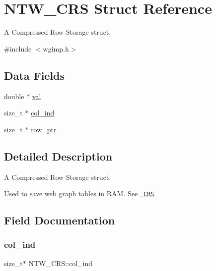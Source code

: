 \hypertarget{structNTW__CRS}{}\section{N\+T\+W\+\_\+\+C\+RS Struct Reference}
\label{structNTW__CRS}


A Compressed Row Storage struct.  




{\ttfamily \#include $<$wgimp.\+h$>$}

\subsection*{Data Fields}
\begin{DoxyCompactItemize}
\item 
double $\ast$ \mbox{\hyperlink{structNTW__CRS_abe01efe3d4a64ef6ed470021481a03ae}{val}}
\item 
size\+\_\+t $\ast$ \mbox{\hyperlink{structNTW__CRS_ac31b5a5fc330dd97ce536dd8a5f9182d}{col\+\_\+ind}}
\item 
size\+\_\+t $\ast$ \mbox{\hyperlink{structNTW__CRS_af5999845d1d6173e930a1c502042d239}{row\+\_\+ptr}}
\end{DoxyCompactItemize}


\subsection{Detailed Description}
A Compressed Row Storage struct. 

Used to save web graph tables in R\+AM. See \href{http://netlib.org/linalg/html_templates/node91.html#SECTION00931100000000000000}\texttt{ C\+RS} 

\subsection{Field Documentation}
\mbox{\label{structNTW__CRS_ac31b5a5fc330dd97ce536dd8a5f9182d}} 
\subsubsection{\texorpdfstring{col\+\_\+ind}{col\_ind}}
{\footnotesize\ttfamily size\+\_\+t$\ast$ N\+T\+W\+\_\+\+C\+R\+S\+::col\+\_\+ind}

